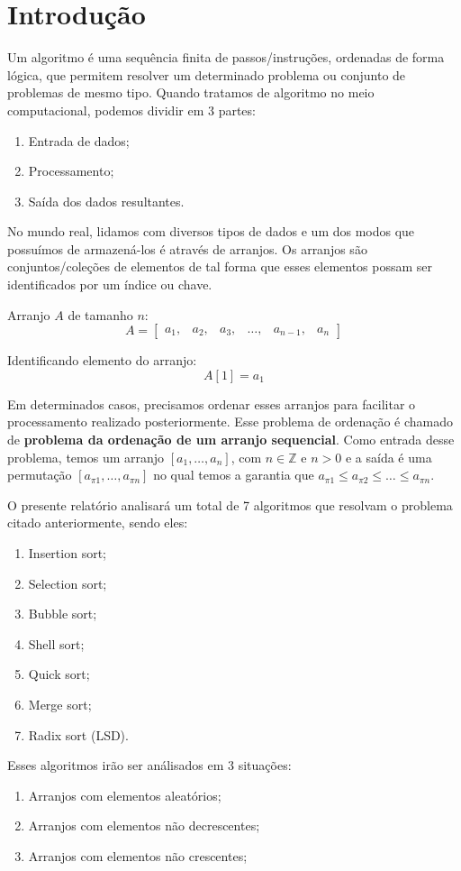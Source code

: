 \chapter{Introdução}
%
%
Um algoritmo é uma sequência finita de passos/instruções, ordenadas de forma lógica, que permitem resolver um determinado problema ou conjunto de problemas de mesmo tipo. Quando tratamos de algoritmo no meio computacional, podemos dividir em 3 partes:
\begin{enumerate}
	\item Entrada de dados;
	\item Processamento;
	\item Saída dos dados resultantes.
\end{enumerate}

%
%
No mundo real, lidamos com diversos tipos de dados e um dos modos que possuímos de armazená-los é através de arranjos. Os arranjos são conjuntos/coleções de elementos de tal forma que esses elementos possam ser identificados por um índice ou chave.

Arranjo $A$ de tamanho $n$:
$$
A = 
\begin{bmatrix}
a_{1}, & a_{2}, & a_{3}, & \dots , & a_{n-1}, & a_{n} 
\end{bmatrix}
$$

Identificando elemento do arranjo:
$$ A[1] = a_{1} $$

%
%
Em determinados casos, precisamos ordenar esses arranjos para facilitar o processamento realizado posteriormente. Esse problema de ordenação é chamado de \textbf{problema da ordenação de um arranjo sequencial}. Como entrada desse problema, temos um arranjo $[ a_{1}, \dots , a_{n} ]$, com $n \in \mathbb{Z}$ e $n > 0$ e a saída é uma permutação $[ a_{\pi1}, \dots , a_{\pi n} ]$ no qual temos a garantia que $a_{\pi 1} \le a_{\pi 2} \le \dots \le a_{\pi n}$.

O presente relatório analisará um total de 7 algoritmos que resolvam o problema citado anteriormente, sendo eles:
\begin{enumerate}
	\item Insertion sort;
	\item Selection sort;
	\item Bubble sort;
	\item Shell sort;
	\item Quick sort;
	\item Merge sort;
	\item Radix sort (LSD).
\end{enumerate}

Esses algoritmos irão ser análisados em 3 situações:
\begin{enumerate}
	\item Arranjos com elementos aleatórios;
	\item Arranjos com elementos não decrescentes;
	\item Arranjos com elementos não crescentes;
\end{enumerate}